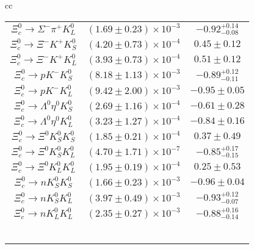 \begin{table}
{\begin{tabular}{cc}
\begin{tabular}[t]{|c|c|c|}
				$ \Xi_{c}^{0} \to \Sigma^{-} \pi^{+} K_{L}^{0} $ &$(1.69\pm 0.23)\times 10^{-3}$ &$      -0.92 ^{+0.14}_{-0.08} $ \\
				$ \Xi_{c}^{0} \to \Xi^{-} K^{+} K_{S}^{0} $ & $(4.20\pm 0.73)\times 10^{-4}$ &$       0.45 \pm       0.12 $ \\
				$ \Xi_{c}^{0} \to \Xi^{-} K^{+} K_{L}^{0} $ &$(3.93\pm 0.73)\times 10^{-4}$& $       0.51 \pm       0.12 $ \\
				$ \Xi_{c}^{0} \to p K^{-} K_{S}^{0} $ &$(8.18\pm 1.13)\times 10^{-3}$& $      -0.89^{+ 0.12}_{-0.11} $ \\
				$ \Xi_{c}^{0} \to p K^{-} K_{L}^{0} $ &$(9.42\pm 2.00)\times 10^{-3}$& $      -0.95 \pm       0.05 $ \\
				$ \Xi_{c}^{0} \to \Lambda^{0} \eta^{0} K_{S}^{0} $ &$(2.69\pm 1.16)\times 10^{-4}$& $      -0.61 \pm       0.28 $ \\
				$ \Xi_{c}^{0} \to \Lambda^{0} \eta^{0} K_{L}^{0} $ &$(3.23\pm 1.27)\times 10^{-4}$& $      -0.84 \pm       0.16 $ \\
				\hline
				$ \Xi_{c}^{0} \to \Xi^{0} K_{S}^{0} K_{S}^{0} $ &$(1.85\pm 0.21)\times 10^{-4}$ &$       0.37 \pm       0.49 $ \\
				$ \Xi_{c}^{0} \to \Xi^{0} K_{S}^{0} K_{L}^{0}$ &$(4.70\pm 1.71)\times 10^{-7}$ &$      -0.85 ^{+0.17}_{-0.15} $ \\
				$ \Xi_{c}^{0} \to \Xi^{0} K_{L}^{0} K_{L}^{0} $ & $(1.95\pm 0.19)\times 10^{-4}$&$       0.25 \pm       0.53 $ \\
				$ \Xi_{c}^{0} \to n K_{S}^{0} K_{S}^{0} $ &$(1.66\pm 0.23)\times 10^{-3}$& $      -0.96 \pm       0.04 $ \\
				$ \Xi_{c}^{0} \to n K_{S}^{0} K_{L}^{0} $ &$(3.97\pm 0.49)\times 10^{-3}$ &$      -0.93 ^{+0.12}_{-0.07} $ \\
				$ \Xi_{c}^{0} \to n K_{L}^{0} K_{L}^{0} $ &$(2.35\pm 0.27)\times 10^{-3}$ &$      -0.88 ^{+ 0.16}_{-0.14} $ \\
				&&\\
				&&\\
				&&\\
				&&\\
				&&\\
				&&\\
				\hline
			\end{tabular}
		\end{tabular}		
	}
\end{table}